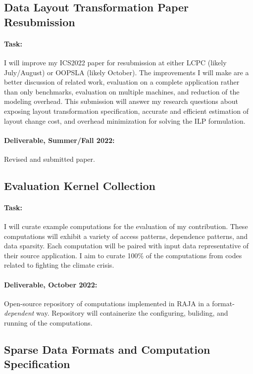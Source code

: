\documentclass{article}
\begin{document}
\subsection{Data Layout Transformation Paper Resubmission}

\paragraph{Task:} I will improve my ICS2022 paper for resubmission at either LCPC (likely July/August) or OOPSLA (likely October). 
The improvements I will make are a better discussion of related work, evaluation on a complete application rather than only benchmarks, evaluation on multiple machines, and reduction of the modeling overhead.
This submission will answer my research questions about exposing layout transformation specification, accurate and efficient estimation of layout change cost, and overhead minimization for solving the ILP formulation.

\paragraph{Deliverable, Summer/Fall 2022:} Revised and submitted paper.


\subsection{Evaluation Kernel Collection}

\paragraph{Task:} I will curate example computations for the evaluation of my contribution.
These computations will exhibit a variety of access patterns, dependence patterns, and data sparsity.
Each computation will be paired with input data representative of their source application. 
I aim to curate 100\% of the computations from codes related to fighting the climate crisis.

\paragraph{Deliverable, October 2022:} Open-source repository of computations implemented in RAJA in a format-\textit{dependent} way. Repository will containerize the configuring, buliding, and running of the computations. 

\subsection{Sparse Data Formats and Computation Specification}
\end{document}

